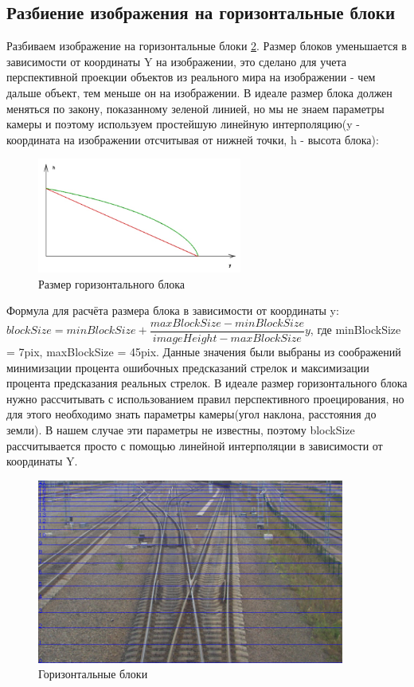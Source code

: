 \subsection{Разбиение изображения на горизонтальные блоки}
Разбиваем изображение на горизонтальные блоки \ref{fig:horizontal_blocks}. Размер блоков уменьшается в зависимости от координаты Y на изображении, это сделано для учета перспективной проекции объектов из реального мира на изображении - чем дальше объект, тем меньше он на изображении. В идеале размер блока должен меняться по закону, показанному зеленой линией, но мы не знаем параметры камеры и поэтому используем простейшую линейную интерполяцию(y - координата на изображении отсчитывая от нижней точки, h - высота блока):
\begin{figure}[!h]
	\centering
	\includegraphics[width=0.6\textwidth]{pictures/graph.jpg}
	\caption[Применение алгоритма Canny]{Размер горизонтального блока}
	\label{fig:hor_block}
\end{figure}
\newpage
Формула для расчёта размера блока в зависимости от координаты y:
\newline
$blockSize = minBlockSize + \dfrac{maxBlockSize - minBlockSize}{imageHeight - maxBlockSize}y$, где  minBlockSize = 7pix, maxBlockSize = 45pix. Данные значения были выбраны из соображений минимизации процента ошибочных предсказаний стрелок и максимизации процента предсказания реальных стрелок.
В идеале размер горизонтального блока нужно рассчитывать с использованием правил перспективного проецирования\cite{b:projection}, но для этого необходимо знать параметры камеры(угол наклона, расстояния до земли).
В нашем случае эти параметры не известны, поэтому blockSize рассчитывается просто с помощью линейной интерполяции в зависимости от координаты Y.

\begin{figure}[!h]
	\centering
	\includegraphics[width=0.9\textwidth]{pictures/horizontal_blocks.png}
	\caption[Разбиение на горизонтальные блоки]{Горизонтальные блоки}
	\label{fig:horizontal_blocks}
\end{figure}

